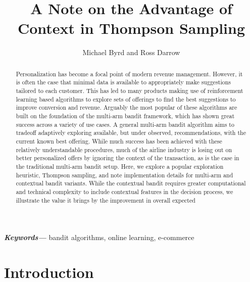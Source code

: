 \documentclass[12pt]{article}
\title{A Note on the Advantage of Context in Thompson Sampling}
\author{Michael Byrd and Ross Darrow}
\providecommand{\keywords}[1]
{
  \small	
  \textbf{\textit{Keywords---}} #1
}
\begin{document}
\maketitle

\begin{abstract}
Personalization has become a focal point of modern revenue management. 
However, it is often the case that minimal data is available to appropriately 
make suggestions tailored to each customer.
This has led to many products making use of reinforcement learning based  
algorithms to explore sets of offerings to find the best suggestions to 
improve conversion and revenue.
Arguably the most popular of these algorithms are built on the foundation of 
the multi-arm bandit framework, which has shown great success across a variety 
of use cases. 
A general multi-arm bandit algorithm aims to tradeoff adaptively exploring 
available, but under observed, recommendations, with the current known best
offering. 
While much success has been achieved with these relatively understandable 
procedures, much of the airline industry is losing out on better personalized 
offers by ignoring the context of the transaction, as is the case in the 
traditional multi-arm bandit setup.
Here, we explore a popular exploration heuristic, Thompson sampling, and note
implementation details for multi-arm and contextual bandit variants.
While the contextual bandit requires greater computational and technical 
complexity to include contextual features in the decision process, we 
illustrate the value it brings by the improvement in overall expected 
\end{abstract}

\keywords{bandit algorithms, online learning, e-commerce}

\section{Introduction}
\end{document}
